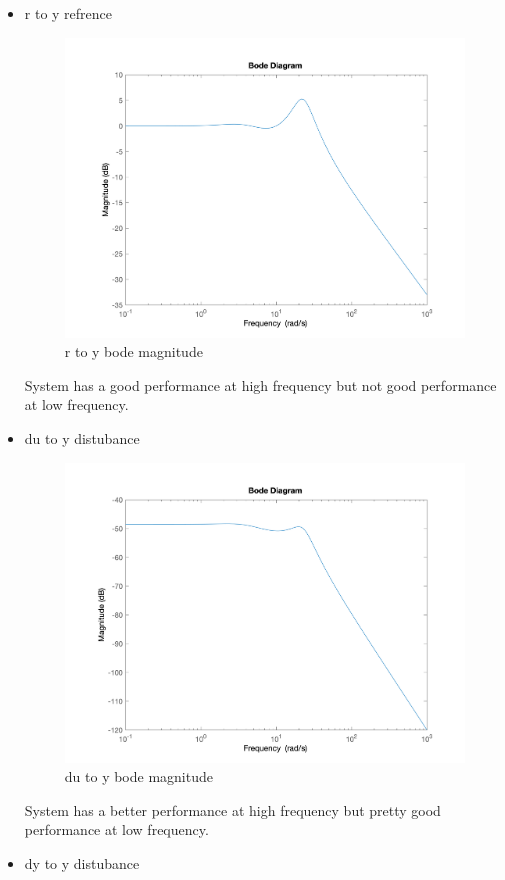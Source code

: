 \begin{itemize}
    \item r to y refrence
    \begin{figure}[H]
        \caption{r to y bode magnitude}
        \centering
        \includegraphics[width=12cm]{../Figure/Q1/Q1_c/bode_r2y.png}
    \end{figure}
    System has a good performance at high frequency but not good performance at low frequency.
    \item du to y distubance
    \begin{figure}[H]
        \caption{du to y bode magnitude}
        \centering
        \includegraphics[width=12cm]{../Figure/Q1/Q1_c/bode_du2y.png}
    \end{figure}
    System has a better performance at high frequency but pretty good performance at low frequency.
    \item dy to y distubance

\end{itemize}
